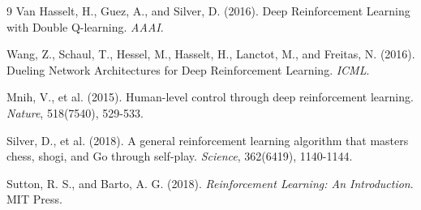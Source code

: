 \documentclass[9pt,a4paper,twocolumn,twoside]{rho-class/rho}
\begin{document}
\begin{thebibliography}{9}
Van Hasselt, H., Guez, A., and Silver, D. (2016). Deep Reinforcement Learning with Double Q-learning. \textit{AAAI}.

Wang, Z., Schaul, T., Hessel, M., Hasselt, H., Lanctot, M., and Freitas, N. (2016). Dueling Network Architectures for Deep Reinforcement Learning. \textit{ICML}.

Mnih, V., et al. (2015). Human-level control through deep reinforcement learning. \textit{Nature}, 518(7540), 529-533.

Silver, D., et al. (2018). A general reinforcement learning algorithm that masters chess, shogi, and Go through self-play. \textit{Science}, 362(6419), 1140-1144.

Sutton, R. S., and Barto, A. G. (2018). \textit{Reinforcement Learning: An Introduction}. MIT Press.
\end{thebibliography}
\end{document}

